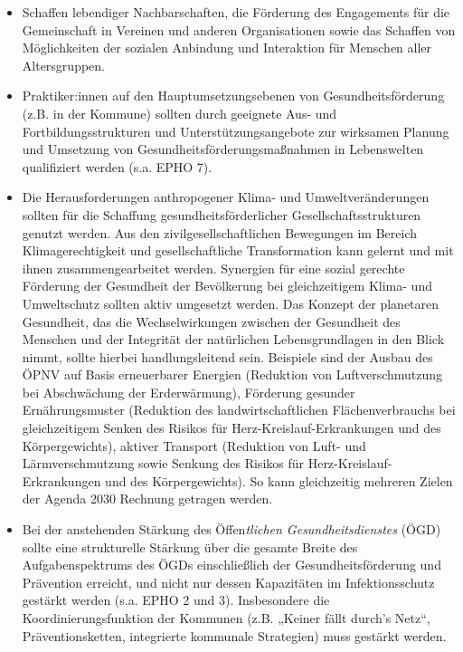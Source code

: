 \documentclass{article}
\begin{document}
\begin{itemize}
\item Schaffen lebendiger Nachbarschaften, die Förderung des Engagements für die Gemeinschaft in Vereinen und anderen Organisationen sowie das Schaffen von Möglichkeiten der sozialen Anbindung und Interaktion für Menschen aller Altersgruppen. 


\item Praktiker:innen auf den Hauptumsetzungsebenen von Gesundheitsförderung (z.B. in der Kommune) sollten durch geeignete Aus- und Fortbildungsstrukturen und Unterstützungsangebote zur wirksamen Planung und Umsetzung von Gesundheitsförderungsmaßnahmen in Lebenswelten qualifiziert werden (s.a. EPHO 7).


\item Die Herausforderungen anthropogener Klima- und Umweltveränderungen sollten für die Schaffung gesundheitsförderlicher Gesellschaftsstrukturen genutzt werden. Aus den zivilgesellschaftlichen Bewegungen im Bereich Klimagerechtigkeit und gesellschaftliche Transformation kann gelernt und mit ihnen zusammengearbeitet werden. Synergien für eine sozial gerechte Förderung der Gesundheit der Bevölkerung bei gleichzeitigem Klima- und Umweltschutz sollten aktiv umgesetzt werden. Das Konzept der planetaren Gesundheit, das die Wechselwirkungen zwischen der Gesundheit des Menschen und der Integrität der natürlichen Lebensgrundlagen in den Blick nimmt, sollte hierbei handlungsleitend sein. Beispiele sind der Ausbau des ÖPNV auf Basis erneuerbarer Energien (Reduktion von Luftverschmutzung bei Abschwächung der Erderwärmung), Förderung gesunder Ernährungsmuster (Reduktion des landwirtschaftlichen Flächenverbrauchs bei gleichzeitigem Senken des Risikos für Herz-Kreislauf-Erkrankungen und des Körpergewichts), aktiver Transport (Reduktion von Luft- und Lärmverschmutzung sowie Senkung des Risikos für Herz-Kreislauf-Erkrankungen und des Körpergewichts). So kann gleichzeitig mehreren Zielen der Agenda 2030 Rechnung getragen werden.


\item Bei der anstehenden Stärkung des Öffen\emph{tlichen Gesundheitsdienstes }(ÖGD) sollte eine strukturelle Stärkung über die gesamte Breite des Aufgabenspektrums des ÖGDs einschließlich der Gesundheitsförderung und Prävention erreicht, und nicht nur dessen Kapazitäten im Infektionsschutz gestärkt werden (s.a. EPHO 2 und 3). Insbesondere die Koordinierungsfunktion der Kommunen (z.B. „Keiner fällt durch's Netz“, Präventionsketten, integrierte kommunale Strategien) muss gestärkt werden.


\end{itemize}
\end{document}
